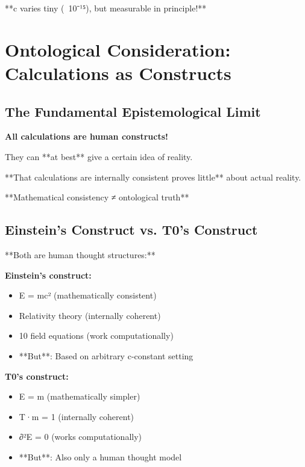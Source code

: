 \documentclass[12pt,a4paper]{article}
\begin{document}
{{{{{{{{{{											**c varies tiny (~10⁻¹⁵), but measurable in principle!**
											
											\section{Ontological Consideration: Calculations as Constructs}
											
											\subsection{The Fundamental Epistemological Limit}
											
											\begin{tcolorbox}[colback=purple!5!white,colframe=purple!75!black,title=Ontological Truth]
												\textbf{All calculations are human constructs!}
												
												They can **at best** give a certain idea of reality.
												
												**That calculations are internally consistent proves little** about actual reality.
												
												**Mathematical consistency ≠ ontological truth**
											\end{tcolorbox}
											
											\subsection{Einstein's Construct vs. T0's Construct}
											
											**Both are human thought structures:**
											
											\textbf{Einstein's construct:}
											\begin{itemize}
												\item E = mc² (mathematically consistent)
												\item Relativity theory (internally coherent)
												\item 10 field equations (work computationally)
												\item **But**: Based on arbitrary c-constant setting
											\end{itemize}
											
											\textbf{T0's construct:}
											\begin{itemize}
												\item E = m (mathematically simpler)
												\item T·m = 1 (internally coherent)
												\item ∂²E = 0 (works computationally)
												\item **But**: Also only a human thought model
											\end{itemize}
											
}}}}}}}}}}
\end{document}
